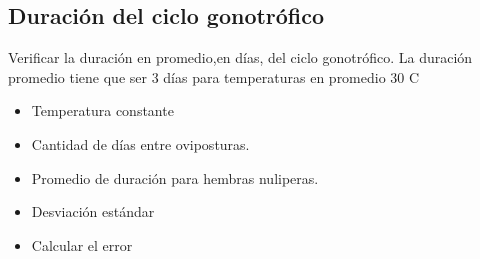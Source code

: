 \subsection{Duración del ciclo gonotrófico}
Verificar la duración en promedio,en días, del ciclo gonotrófico. La duración promedio tiene que ser 3
días para temperaturas en promedio 30 C

\begin{itemize}
    \item Temperatura constante 
    \item Cantidad de días entre oviposturas.
    \item Promedio de duración para hembras nuliperas.
    \item Desviación estándar
    \item Calcular el error
\end{itemize}
